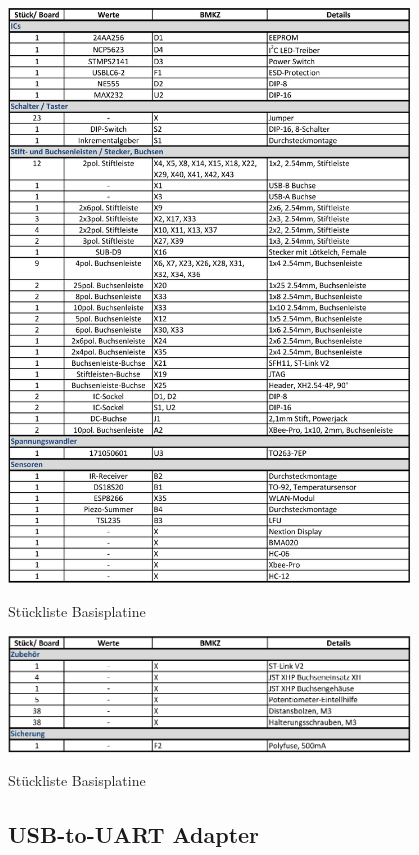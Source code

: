 \begin{table}[htb]\ContinuedFloat
    \centering
    \includegraphics[width=0.8\textwidth]{Schuh/Pictures/stuck-basis2}
    \caption[Stückliste Basisplatine]{Stückliste \gls{Basisplatine}}
\end{table}
\begin{table}[htb]\ContinuedFloat
    \centering
    \includegraphics[width=0.8\textwidth]{Schuh/Pictures/stuck-basis3}
    \caption[Stückliste Basisplatine]{Stückliste \gls{Basisplatine}}
\end{table}

\subsection{USB-to-UART Adapter}
\label{sec:stücklisten-usbtouart}

